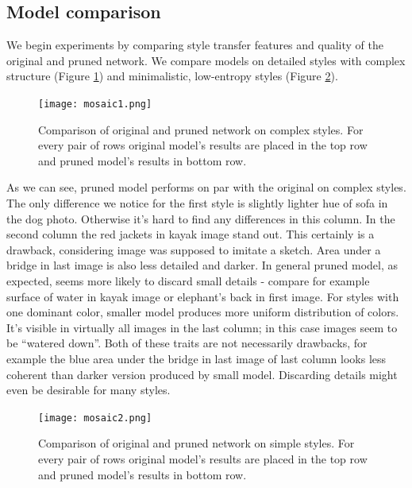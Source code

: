 \documentclass[../Main.tex]{subfiles}
\begin{document}
\subsection{Model comparison}
We begin experiments by comparing style transfer features and quality of the
original and pruned network. We compare models on detailed styles with complex 
structure (Figure \ref{fig:mosaic1}) and minimalistic, low-entropy styles 
(Figure \ref{fig:mosaic2}). 
        \begin{figure}[h!]
        \centering
            \texttt{[image: mosaic1.png]}
            \caption{Comparison of original and pruned network on complex styles. 
            For every pair of rows original model's results are placed in the
            top row and pruned model's results in bottom row.
            }
            \label{fig:mosaic1}
        \end{figure}
As we can see, pruned model performs on par with the original on complex styles.
The only difference we notice for the first style is slightly lighter hue of sofa
in the dog photo. Otherwise it's hard to find any differences in this column.
In the second column the red jackets in kayak image stand out. This certainly is a drawback,
considering image was supposed to imitate a sketch. Area under a bridge in last 
image is also less detailed and darker. In general pruned model, as expected,
seems more likely to discard small details - compare for example surface of water in kayak image
or elephant's back in first image. For styles with one dominant color, smaller
model produces more uniform distribution of colors. It's visible in virtually
all images in the last column; in this case images seem to be ``watered down''.
Both of these traits are not necessarily drawbacks, for example the blue area
under the bridge in last image of last column looks less coherent than darker version
produced by small model. Discarding details might even be desirable for many styles.

        \begin{figure}[h!]
        \centering
            \texttt{[image: mosaic2.png]}
            \caption{Comparison of original and pruned network on simple styles. 
            For every pair of rows original model's results are placed in the
            top row and pruned model's results in bottom row.
            }
            \label{fig:mosaic2}
        \end{figure} 
 
\end{document}

